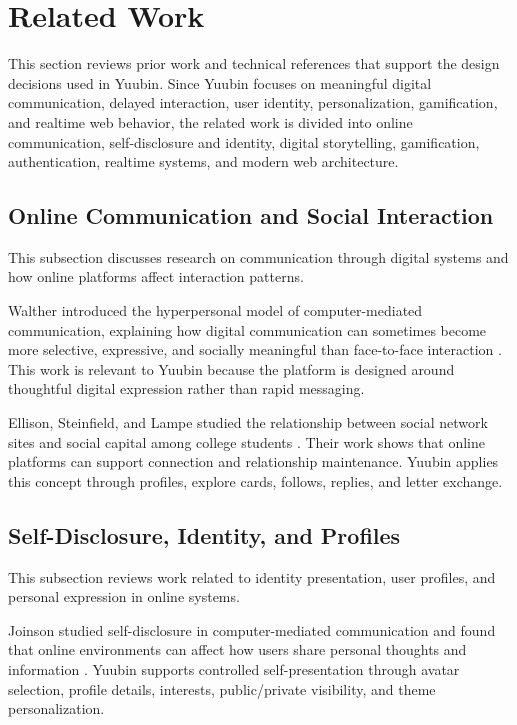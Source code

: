 ﻿\documentclass[12pt,a4paper]{report}
\begin{document}
\section{Related Work}

This section reviews prior work and technical references that support the design decisions used in Yuubin. Since Yuubin focuses on meaningful digital communication, delayed interaction, user identity, personalization, gamification, and realtime web behavior, the related work is divided into online communication, self-disclosure and identity, digital storytelling, gamification, authentication, realtime systems, and modern web architecture.

\subsection{Online Communication and Social Interaction}
This subsection discusses research on communication through digital systems and how online platforms affect interaction patterns.

Walther introduced the hyperpersonal model of computer-mediated communication, explaining how digital communication can sometimes become more selective, expressive, and socially meaningful than face-to-face interaction \cite{walther1996cmc}. This work is relevant to Yuubin because the platform is designed around thoughtful digital expression rather than rapid messaging.

Ellison, Steinfield, and Lampe studied the relationship between social network sites and social capital among college students \cite{ellison2007socialcapital}. Their work shows that online platforms can support connection and relationship maintenance. Yuubin applies this concept through profiles, explore cards, follows, replies, and letter exchange.

\subsection{Self-Disclosure, Identity, and Profiles}
This subsection reviews work related to identity presentation, user profiles, and personal expression in online systems.

Joinson studied self-disclosure in computer-mediated communication and found that online environments can affect how users share personal thoughts and information \cite{joinson2001selfdisclosure}. Yuubin supports controlled self-presentation through avatar selection, profile details, interests, public/private visibility, and theme personalization.
\end{document}
